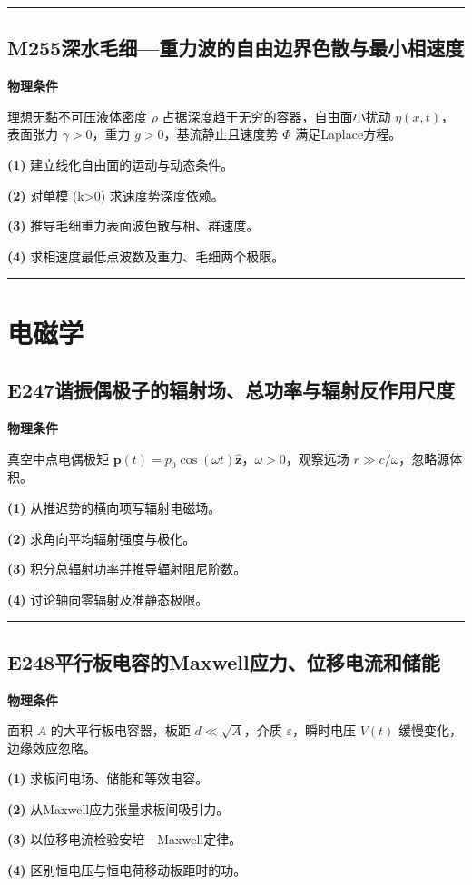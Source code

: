 \documentclass[UTF8,a4paper,11pt,oneside,openany]{ctexbook}
\begin{document}
\par\bigskip\hrule\bigskip
\section*{M255\quad 深水毛细—重力波的自由边界色散与最小相速度}
\textbf{物理条件}\par 理想无黏不可压液体密度 \(\rho\) 占据深度趋于无穷的容器，自由面小扰动 \(\eta(x,t)\)，表面张力 \(\gamma>0\)，重力 \(g>0\)，基流静止且速度势 \(\Phi\) 满足Laplace方程。
\par\noindent\textbf{(1)} 建立线化自由面的运动与动态条件。
\par\noindent\textbf{(2)} 对单模 (k>0) 求速度势深度依赖。
\par\noindent\textbf{(3)} 推导毛细重力表面波色散与相、群速度。
\par\noindent\textbf{(4)} 求相速度最低点波数及重力、毛细两个极限。

\par\bigskip\hrule\bigskip
\chapter{电磁学}
\section*{E247\quad 谐振偶极子的辐射场、总功率与辐射反作用尺度}
\textbf{物理条件}\par 真空中点电偶极矩 \(\boldsymbol p(t)=p_0\cos(\omega t)\hat{\boldsymbol z}\)，\(\omega>0\)，观察远场 \(r\gg c/\omega\)，忽略源体积。
\par\noindent\textbf{(1)} 从推迟势的横向项写辐射电磁场。
\par\noindent\textbf{(2)} 求角向平均辐射强度与极化。
\par\noindent\textbf{(3)} 积分总辐射功率并推导辐射阻尼阶数。
\par\noindent\textbf{(4)} 讨论轴向零辐射及准静态极限。

\par\bigskip\hrule\bigskip
\section*{E248\quad 平行板电容的Maxwell应力、位移电流和储能}
\textbf{物理条件}\par 面积 \(A\) 的大平行板电容器，板距 \(d\ll\sqrt A\)，介质 \(\varepsilon\)，瞬时电压 \(V(t)\) 缓慢变化，边缘效应忽略。
\par\noindent\textbf{(1)} 求板间电场、储能和等效电容。
\par\noindent\textbf{(2)} 从Maxwell应力张量求板间吸引力。
\par\noindent\textbf{(3)} 以位移电流检验安培—Maxwell定律。
\par\noindent\textbf{(4)} 区别恒电压与恒电荷移动板距时的功。
\end{document}
